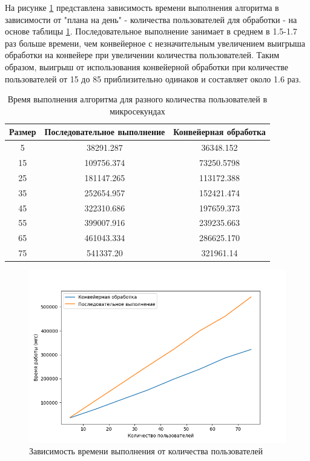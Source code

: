 \documentclass[a4paper,oneside,14pt]{extreport}
\begin{document}
На рисунке \ref{fig:graph} представлена зависимость времени выполнения алгоритма в зависимости от "плана на день" - количества пользователей для обработки - на основе таблицы \ref{tab:time}. Последовательное выполнение занимает в среднем в 1.5-1.7 раз больше времени, чем конвейерное с незначительным увеличением выигрыша обработки на конвейере при увеличении количества пользователей. Таким образом, выигрыш от использования конвейерной обработки при количестве пользователей от 15 до 85 приблизительно одинаков и составляет около 1.6 раз.
\begin{table}[H]
	\begin{center}
		\captionsetup{justification=raggedleft, singlelinecheck=false}
		\caption{\label{tab:time} Время выполнения алгоритма для разного количества пользователей в микросекундах}
		\begin{tabular}{|c| c | c|} 
			\hline
			Размер&Последовательное выполнение&Конвейерная обработка\\ [0.5ex]
			\hline
	   		   5 &   38291.287 &  36348.152\\ 
	   		\hline
	   		15 &   109756.374 &   73250.5798 \\ 
	   		\hline
	   		25 &   181147.265 &   113172.388 \\ 
	   		\hline
	   		35 &   252654.957 &   152421.474 \\ 
	   		\hline
	   		45 &  322310.686 &  197659.373 \\ 
	   		\hline
	   		55 & 399007.916 & 239235.663 \\ 
	   		\hline
	   		65 & 461043.334 & 286625.170 \\ 
	   		\hline
	   		75 & 541337.20 & 321961.14 \\ 
	   		\hline
		\end{tabular}
	\end{center}
\end{table}

\begin{figure}[H]
	\centering
	\includegraphics[width=0.9\linewidth]{images/con_vs_serial}
	\caption{Зависимость времени выполнения от количества пользователей}
	\label{fig:graph}
\end{figure}
\end{document}
